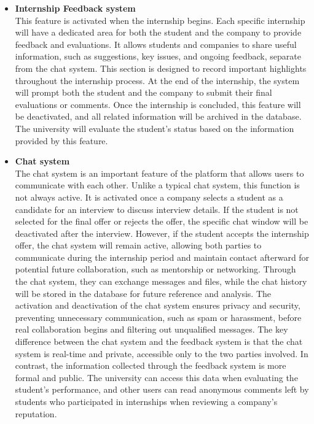 \begin{itemize}[label={ }]
    \item \textcolor{bluepoli}{\textbf{Internship Feedback system}}
    \\This feature is activated when the internship begins. Each specific internship will have a dedicated area for both the student and the company to
    provide feedback and evaluations.
    It allows students and companies to share useful information, such as suggestions, key issues, and ongoing feedback, separate from the chat system. 
    This section is designed to record important highlights throughout the internship process. At the end of the internship, the system will prompt both 
    the student and the company to submit their final evaluations or comments. Once the internship is concluded, this feature will be deactivated, and 
    all related information will be archived in the database. The university will evaluate the student's status based on the information provided by this
    feature.
    \item \textcolor{bluepoli}{\textbf{Chat system}}
    \\The chat system is an important feature of the platform that allows users to communicate with each other. Unlike a typical chat system, this function
    is not always active. It is activated once a company selects a student as a candidate for an interview to discuss interview details. 
    If the student is not selected for the final offer or rejects the offer, the specific chat window will be deactivated after the interview. However, 
    if the student accepts the internship offer, the chat system will remain active, allowing both parties to communicate during the internship period and 
    maintain contact afterward for potential future collaboration, such as mentorship or networking.
    Through the chat system, they can exchange messages and files, while the chat history will be stored in the database for future reference and analysis.
    The activation and deactivation of the chat system ensures privacy and security, preventing unnecessary communication, such as spam or harassment, 
    before real collaboration begins and filtering out unqualified messages.
    The key difference between the chat system and the feedback system is that the chat system is real-time and private, accessible only to the two parties 
    involved. In contrast, the information collected through the feedback system is more formal and public. The university can access this data when evaluating
    the student's performance, and other users can read anonymous comments left by students who participated in internships when reviewing a company's reputation.


\end{itemize}
